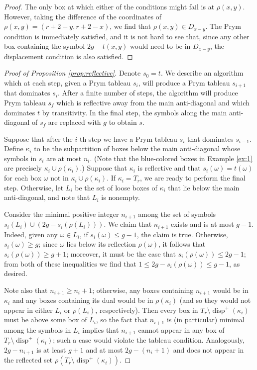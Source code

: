 \documentclass[11pt,reqno]{amsart}
\newcommand*{\disp}{\operatorname{disp}^{+}}
\theoremstyle{definition}
\theoremstyle{problem}
\theoremstyle{plain}
\theoremstyle{remark}
\theoremstyle{theorem}
\numberwithin{equation}{section}
\numberwithin{figure}{section}
\theoremstyle{definition}
\theoremstyle{problem}
\theoremstyle{plain}
\begin{document}
\begin{proof}
  The only box at which either of the conditions might fail is at
  $\rho(x,y)$.  However, taking the difference of the coordinates of
  $\rho(x,y) = (r+2-y,r+2-x)$, we find that $\rho(x,y) \in D_{x-y}$.
  The Prym condition is immediately satisfied, and it is not hard to
  see that, since any other box containing the symbol $2g - t(x,y)$
  would need to be in $D_{x-y}$, the displacement condition is also
  satisfied.
\end{proof}

\begin{proof}[Proof of Proposition \ref{prop:reflective}]
  Denote $s_0=t$. We describe an algorithm which at each step, given a Prym tableau $s_i$, will produce a
  Prym tableau $s_{i+1}$ that dominates $s_i$. After a finite number of steps, 
  the algorithm will produce Prym
  tableau $s_f$ which is reflective away from the main anti-diagonal
  and which dominates $t$ by transitivity.  In the final step,   the symbols along the main anti-diagonal of $s_f$ are replaced with
  $g$ to obtain $s$.

  Suppose that after the $i$-th step we have a Prym tableau $s_i$ that
  dominates $s_{i-1}$.  Define $\kappa_i$ to be the subpartition of
  boxes below the main anti-diagonal whose symbols in $s_i$ are at most
  $n_i$.  (Note that the blue-colored boxes in Example \ref{ex:1} are
  precisely $\kappa_i \cup \rho(\kappa_i)$.)  Suppose that $\kappa_i$
  is reflective and that $s_i(\omega) = t(\omega)$ for each box
  $\omega$ not in $\kappa_i \cup \rho(\kappa_i)$.  If
  $\kappa_i = T_r$, we are ready to perform the final step.
  Otherwise, let $L_i$ be the set of loose boxes of $\kappa_i$ that
  lie below the main anti-diagonal, and note that $L_i$ is nonempty.

  Consider the minimal positive integer $n_{i+1}$ among the set of
  symbols $s_i(L_i) \cup (2g - s_i(\rho(L_i)))$.  We claim that
  $n_{i+1}$ exists and is at most $g-1$.  Indeed, given any
  $\omega \in L_i$, if $s_i(\omega) \leq g-1$, the claim is true.
  Otherwise, $s_i(\omega) \geq g$; since $\omega$ lies below its
  reflection $\rho(\omega)$, it follows that $s_i(\rho(\omega)) \geq g+1$; moreover, it must be
  the case that $s_i(\rho(\omega)) \leq 2g-1$; from both of these
  inequalities we find that $1 \leq 2g-s_i(\rho(\omega)) \leq g-1$, as
  desired.

  Note also that $n_{i+1} \geq n_i+1$; otherwise, any boxes containing
  $n_{i+1}$ would be in $\kappa_i$ and any boxes containing its dual
  would be in $\rho(\kappa_i)$ (and so they would not appear in either
  $L_i$ or $\rho(L_i)$, respectively).  Then every box in
  $T_r \setminus \disp(\kappa_i)$ must be above some box of $L_i$, so
  the fact that $n_{i+1}$ is (in particular) minimal among the symbols
  in $L_i$ implies that $n_{i+1}$ cannot appear in any box of
  $T_r \setminus \disp(\kappa_i)$; such a case would violate the
  tableau condition.  Analogously, $2g-n_{i+1}$ is at least $g+1$ and
  at most $2g-(n_i+1)$ and does not appear in the reflected set
  $\rho(T_r \setminus \disp(\kappa_i))$.


\end{proof}
\end{document}
